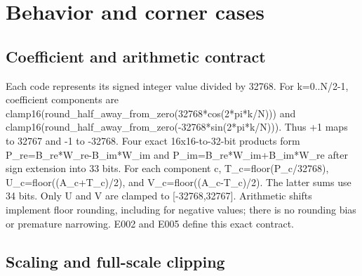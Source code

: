 \documentclass[11pt,a4paper]{article}
\begin{document}
\section{Behavior and corner cases}

\subsection{Coefficient and arithmetic contract}

Each code represents its signed integer value divided by 32768. For k=\allowbreak{}0..N/\allowbreak{}2-1,\allowbreak{} coefficient components are clamp16(\allowbreak{}round\_\allowbreak{}half\_\allowbreak{}away\_\allowbreak{}from\_\allowbreak{}zero(\allowbreak{}32768*\allowbreak{}cos(\allowbreak{}2*\allowbreak{}pi*\allowbreak{}k/\allowbreak{}N)\allowbreak{})\allowbreak{})\allowbreak{} and clamp16(\allowbreak{}round\_\allowbreak{}half\_\allowbreak{}away\_\allowbreak{}from\_\allowbreak{}zero(\allowbreak{}-32768*\allowbreak{}sin(\allowbreak{}2*\allowbreak{}pi*\allowbreak{}k/\allowbreak{}N)\allowbreak{})\allowbreak{})\allowbreak{}. Thus +\allowbreak{}1 maps to 32767 and -1 to -32768. Four exact 16x16-to-32-bit products form P\_\allowbreak{}re=\allowbreak{}B\_\allowbreak{}re*\allowbreak{}W\_\allowbreak{}re-B\_\allowbreak{}im*\allowbreak{}W\_\allowbreak{}im and P\_\allowbreak{}im=\allowbreak{}B\_\allowbreak{}re*\allowbreak{}W\_\allowbreak{}im+\allowbreak{}B\_\allowbreak{}im*\allowbreak{}W\_\allowbreak{}re after sign extension into 33 bits. For each component c,\allowbreak{} T\_\allowbreak{}c=\allowbreak{}floor(\allowbreak{}P\_\allowbreak{}c/\allowbreak{}32768)\allowbreak{},\allowbreak{} U\_\allowbreak{}c=\allowbreak{}floor(\allowbreak{}(\allowbreak{}A\_\allowbreak{}c+\allowbreak{}T\_\allowbreak{}c)\allowbreak{}/\allowbreak{}2)\allowbreak{},\allowbreak{} and V\_\allowbreak{}c=\allowbreak{}floor(\allowbreak{}(\allowbreak{}A\_\allowbreak{}c-T\_\allowbreak{}c)\allowbreak{}/\allowbreak{}2)\allowbreak{}. The latter sums use 34 bits. Only U and V are clamped to [\allowbreak{}-32768,\allowbreak{}32767]\allowbreak{}. Arithmetic shifts implement floor rounding,\allowbreak{} including for negative values; there is no rounding bias or premature narrowing. E002 and E005 define this exact contract.

\subsection{Scaling and full-scale clipping}
\end{document}
